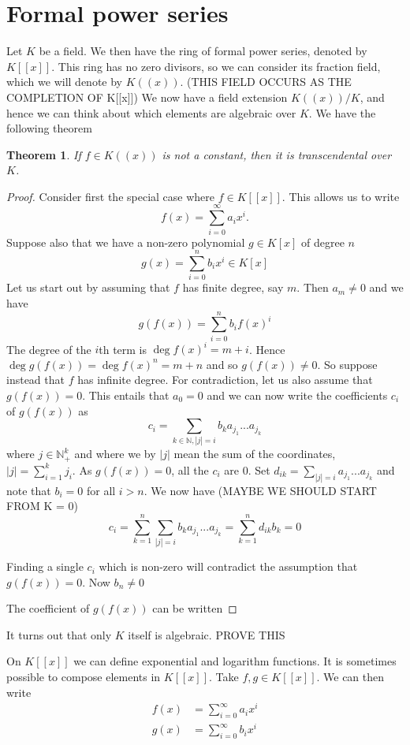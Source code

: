 \documentclass{article}
\newtheorem{theorem}{Theorem}[section]
\newcommand{\mbb}[1]{\mathbb{#1}}
\begin{document}
\section{Formal power series}
Let $K$ be a field. We then have the ring of formal power series, denoted by $K[[x]]$. This ring has no zero divisors, so we can consider its fraction field, which we will denote by $K((x))$. (THIS FIELD OCCURS AS THE COMPLETION OF K[[x]]) We now have a field extension $K((x)) / K$, and hence we can think about which elements are algebraic over $K$. We have the following theorem
\begin{theorem}
    If $f \in K((x))$ is not a constant, then it is transcendental over $K$.  
\end{theorem}

\begin{proof}
    Consider first the special case where $f \in K[[x]]$. This allows us to write
    $$f(x) = \sum_{i = 0}^\infty a_i x^i.$$
    Suppose also that we have a non-zero polynomial $g \in K[x]$ of degree $n$
    $$g(x) = \sum_{i = 0}^n b_i x^i \in K[x]$$
    Let us start out by assuming that $f$ has finite degree, say $m$. Then $a_m \neq 0$ and we have
    $$g(f(x)) = \sum_{i = 0}^n b_i f(x)^i$$
    The degree of the $i$th term is $\deg f(x)^i = m + i$. Hence $\deg g(f(x)) = \deg f(x)^n = m + n$ and so $g(f(x)) \neq 0$. So suppose instead that $f$ has infinite degree. For contradiction, let us also assume that $g(f(x)) = 0$. This entails that $a_0 = 0$ and we can now write the coefficients $c_i$ of $g(f(x))$ as
    $$c_i = \sum_{k \in \mbb N, |j| = i}b_k a_{j_1} ...a_{j_k}$$
    where $j \in \mbb N_+^k$ and where we by $|j|$ mean the sum of the coordinates, $|j| = \sum_{i=1}^k j_i$. As $g(f(x)) = 0$, all the $c_i$ are 0. Set $d_{ik} = \sum_{|j| = i} a_{j_1} ...a_{j_k}$ and note that $b_i = 0$ for all $i > n$. We now have (MAYBE WE SHOULD START FROM K = 0)
    $$c_i = \sum_{k = 1}^n \sum_{|j| = i}b_k a_{j_1} ...a_{j_k} = \sum_{k=1}^n d_{ik} b_k = 0$$

    
    
    Finding a single $c_i$ which is non-zero will contradict the assumption that $g(f(x)) = 0$. Now $b_n \neq 0$ 
     
    The coefficient of $g(f(x))$ can be written 
\end{proof}

It turns out that only $K$ itself is algebraic. PROVE THIS


On $K[[x]]$ we can define exponential and logarithm functions. It is sometimes possible to compose elements in $K[[x]]$. Take $f, g \in K[[x]]$. We can then write 
\begin{align*}
    f(x) &= \sum_{i = 0}^\infty a_i x^i \\
    g(x) &= \sum_{i = 0}^\infty b_i x^i
\end{align*}
\end{document}
